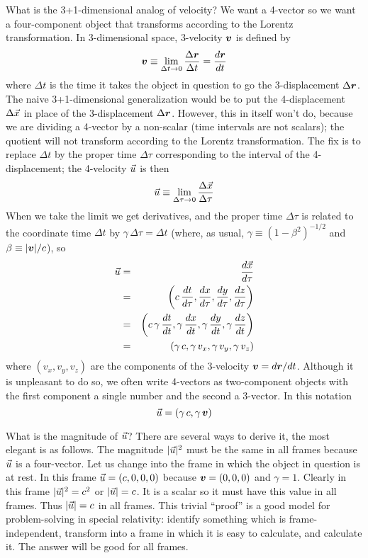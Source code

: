 What is the 3+1-dimensional analog of velocity?  We want a 4-vector so
we want a four-component object that transforms according to the
Lorentz transformation.  In 3-dimensional space, 3-velocity $\mbox{\boldmath $v$}$
is defined by
\begin{equation}
\mbox{\boldmath $v$} \equiv \lim_{\Delta t\rightarrow 0} \frac{\Delta\mbox{\boldmath $r$}}{\Delta t}
= \frac{d\mbox{\boldmath $r$}}{dt}
\end{equation}
where $\Delta t$ is the time it takes the object in question to go the
3-displacement $\Delta\mbox{\boldmath $r$}$.  The naive 3+1-dimensional
generalization would be to put the 4-displacement $\Delta\vec{x}$ in
place of the 3-displacement $\Delta\mbox{\boldmath $r$}$.  However, this in itself
won't do, because we are dividing a 4-vector by a non-scalar (time
intervals are not scalars); the quotient will not transform according
to the Lorentz transformation.  The fix is to replace $\Delta t$ by
the proper time $\Delta\tau$ corresponding to the interval of the
4-displacement; the 4-velocity $\vec{u}$ is then
\begin{equation}
\vec{u}\equiv\lim_{\Delta\tau\rightarrow 0}\frac{\Delta\vec{x}}{\Delta\tau}
\end{equation}
When we take the limit we get derivatives, and the proper time
$\Delta\tau$ is related to the coordinate time $\Delta t$ by
$\gamma\,\Delta\tau =\Delta t$ (where, as usual, $\gamma\equiv
(1-\beta^2)^{-1/2}$ and $\beta\equiv |\mbox{\boldmath $v$}|/c$), so
\begin{eqnarray}
\vec{u} & = & \frac{d\vec{x}}{d\tau} \nonumber\\
& = & \left(c\,\frac{dt}{d\tau},\frac{dx}{d\tau},
            \frac{dy}{d\tau},\frac{dz}{d\tau} \right) \nonumber\\
& = & \left(c\,\gamma\,\frac{dt}{dt},\gamma\,\frac{dx}{dt},
            \gamma\,\frac{dy}{dt},\gamma\,\frac{dz}{dt} \right) \nonumber\\
& = & (\gamma\,c,\gamma\,v_x,\gamma\,v_y,\gamma\,v_z)
\end{eqnarray}
where $(v_x,v_y,v_z)$ are the components of the 3-velocity
$\mbox{\boldmath $v$}=d\mbox{\boldmath $r$}/dt$.  Although it is unpleasant to do so, we often
write 4-vectors as two-component objects with the first component a
single number and the second a 3-vector.  In this notation
\begin{equation}
\vec{u} = (\gamma\,c,\gamma\,\mbox{\boldmath $v$})
\end{equation}

What is the magnitude of $\vec{u}$?  There are several ways to derive
it, the most elegant is as follows.  The magnitude $|\vec{u}|^2$ must
be the same in all frames because $\vec{u}$ is a four-vector.  Let us
change into the frame in which the object in question is at rest.  In
this frame $\vec{u}=(c,0,0,0)$ because $\mbox{\boldmath $v$}=(0,0,0)$ and $\gamma=1$.
Clearly in this frame $|\vec{u}|^2=c^2$ or $|\vec{u}|=c$.  It is a
scalar so it must have this value in all frames.  Thus $|\vec{u}|=c$ in
all frames.  This trivial ``proof'' is a good model for
problem-solving in special relativity: identify something which is
frame-independent, transform into a frame in which it is easy to
calculate, and calculate it.  The answer will be good for all frames.

